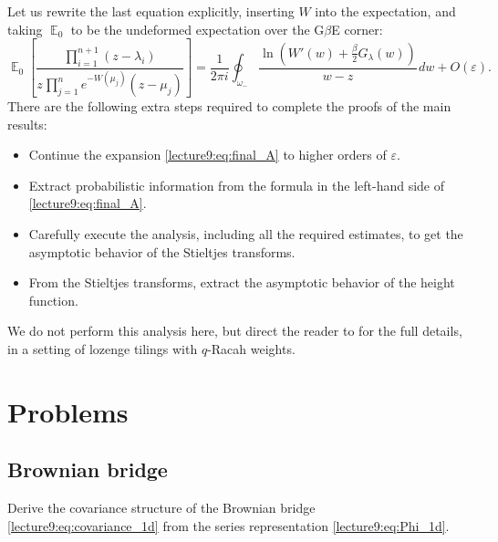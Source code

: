 \documentclass[letterpaper,11pt,oneside,reqno]{book}
\numberwithin{equation}{chapter}  %
\newcommand{\ssp}{\hspace{1pt}}
\theoremstyle{definition}
\begin{document}
Let us rewrite the last equation explicitly, inserting $W$ into the
expectation, and taking $\operatorname{\mathbb{E}}_0$ to be the
undeformed expectation over the G$\beta$E corner:
\begin{equation}
	\label{lecture9:eq:final_A}
	\operatorname{\mathbb{E}}_0
	\left[
		\frac{\prod_{i=1}^{n+1}(z-\lambda_i)}{z\ssp \prod_{j=1}^{n}e^{-W(\mu_j)}(z-\mu_j)}
	\right]
	=
	\frac{1}{2 \pi i}\oint_{\omega_-}
	\frac{\ln
	\left(
		W'(w)+\frac{\beta}{2}G_\lambda(w)
	\right)}{w-z}\ssp dw+O(\varepsilon).
\end{equation}
There are the following extra steps required to complete the proofs of the main
results:
\begin{itemize}
	\item Continue the expansion \eqref{lecture9:eq:final_A} to higher orders of $\varepsilon$.
	\item Extract probabilistic information from the formula in the left-hand side of
		\eqref{lecture9:eq:final_A}.
	\item Carefully execute the analysis, including all the required estimates,
		to get the asymptotic behavior of the Stieltjes transforms.
	\item From the Stieltjes transforms, extract the asymptotic behavior of the height function.
\end{itemize}

We do not perform this analysis here, but
direct the reader to \cite{gorin2022dynamical} for the full details,
in a setting of lozenge tilings with $q$-Racah weights.






\section{Problems}

\subsection{Brownian bridge}

Derive the covariance structure of the Brownian bridge
\eqref{lecture9:eq:covariance_1d} from the series representation
\eqref{lecture9:eq:Phi_1d}.
\end{document}
